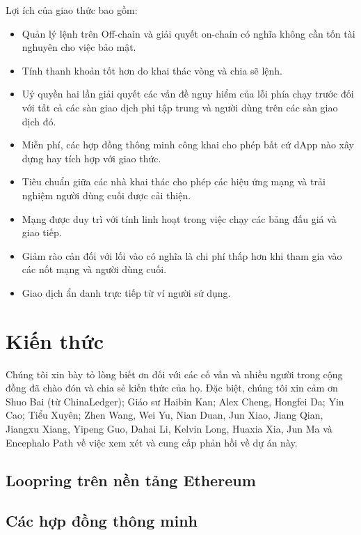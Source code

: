 \documentclass[12pt,a4paper]{article}
\begin{document}
\begin{multicols}{2}
Lợi ích của giao thức bao gồm:

\begin{itemize}
	\item Quản lý lệnh trên Off-chain  và giải quyết on-chain  có nghĩa không cần tốn tài nghuyên cho việc bảo mật.
	\item Tính thanh khoản tốt hơn do khai thác vòng và chia sẽ lệnh.
	\item Uỷ quyền hai lần giải quyết các vấn đề nguy hiểm của lỗi phía chạy trước đối với tất cả các sàn giao dịch phi tập trung và người dùng trên các sàn giao dịch đó.
	\item Miễn phí, các hợp đồng thông minh công khai cho phép bất cứ dApp nào xây dựng hay tích hợp với giao thức.
	\item Tiêu chuẩn giữa các nhà khai thác cho phép các hiệu ứng mạng và trải nghiệm người dùng cuối được cải thiện.
	\item Mạng được duy trì với tính linh hoạt trong việc chạy các bảng đấu giá và giao tiếp.
	\item Giảm rào cản đối với lối vào có nghĩa là chi phí thấp hơn khi tham gia vào các nốt mạng và người dùng cuối.
	\item Giao dịch ẩn danh trực tiếp từ ví người sử dụng.
\end{itemize}
\section{Kiến thức}
Chúng tôi xin bày tỏ lòng biết ơn đối với các cố vấn và nhiều người trong cộng đồng đã chào đón và chia sẻ kiến thức của họ. Đặc biệt, chúng tôi xin cảm ơn Shuo Bai (từ ChinaLedger); Giáo sư Haibin Kan; Alex Cheng, Hongfei Da; Yin Cao; Tiểu Xuyên; Zhen Wang, Wei Yu, Nian Duan, Jun Xiao, Jiang Qian, Jiangxu Xiang, Yipeng Guo, Dahai Li, Kelvin Long, Huaxia Xia, Jun Ma và Encephalo Path về việc xem xét và cung cấp phản hồi về dự án này.



\begin{appendices}
\section{Loopring trên nền tảng Ethereum}
\subsection{Các hợp đồng thông minh}



\end{appendices}
\end{multicols}
\end{document}
